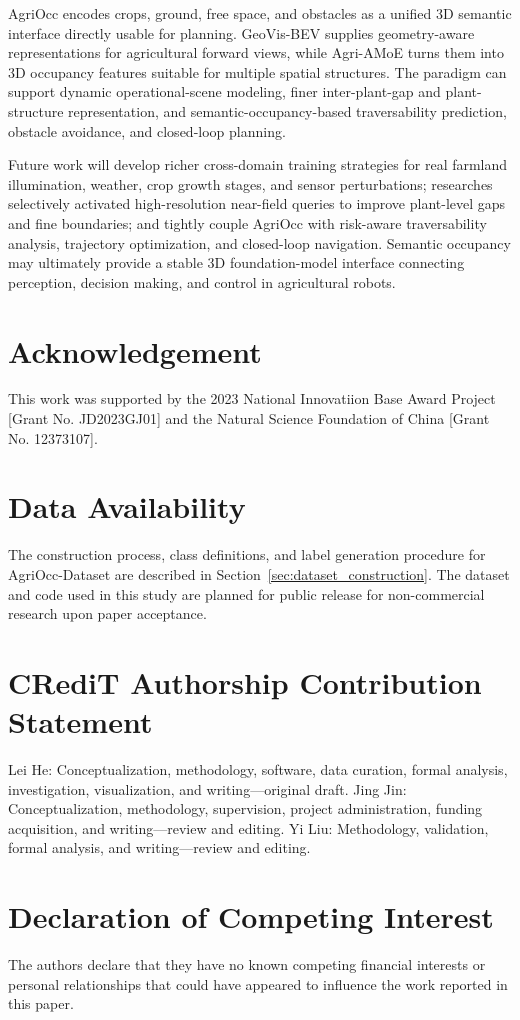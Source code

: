 \documentclass[a4paper,fleqn]{cas-sc}
\begin{document}
AgriOcc encodes crops, ground, free space, and obstacles as a unified 3D semantic interface directly usable for planning. GeoVis-BEV supplies geometry-aware representations for agricultural forward views, while Agri-AMoE turns them into 3D occupancy features suitable for multiple spatial structures. The paradigm can support dynamic operational-scene modeling, finer inter-plant-gap and plant-structure representation, and semantic-occupancy-based traversability prediction, obstacle avoidance, and closed-loop planning.

Future work will develop richer cross-domain training strategies for real farmland illumination, weather, crop growth stages, and sensor perturbations; researches selectively activated high-resolution near-field queries to improve plant-level gaps and fine boundaries; and tightly couple AgriOcc with risk-aware traversability analysis, trajectory optimization, and closed-loop navigation. Semantic occupancy may ultimately provide a stable 3D foundation-model interface connecting perception, decision making, and control in agricultural robots.


\section*{Acknowledgement}
This work was supported by the 2023 National Innovatiion Base Award Project [Grant No. JD2023GJ01] 
and the Natural Science Foundation of China [Grant No. 12373107].

\section*{Data Availability}
The construction process, class definitions, and label generation procedure for AgriOcc-Dataset are described in Section~\ref{sec:dataset_construction}. The dataset and code used in this study are planned for public release for non-commercial research upon paper acceptance.

\section*{CRediT Authorship Contribution Statement}
Lei He: Conceptualization, methodology, software, data curation, formal analysis, investigation, visualization, and writing---original draft. 
Jing Jin: Conceptualization, methodology, supervision, project administration, funding acquisition, and writing---review and editing. 
Yi Liu: Methodology, validation, formal analysis, and writing---review and editing.

\section*{Declaration of Competing Interest}
The authors declare that they have no known competing financial interests or personal relationships that could have appeared to influence the work reported in this paper.



\end{document}
